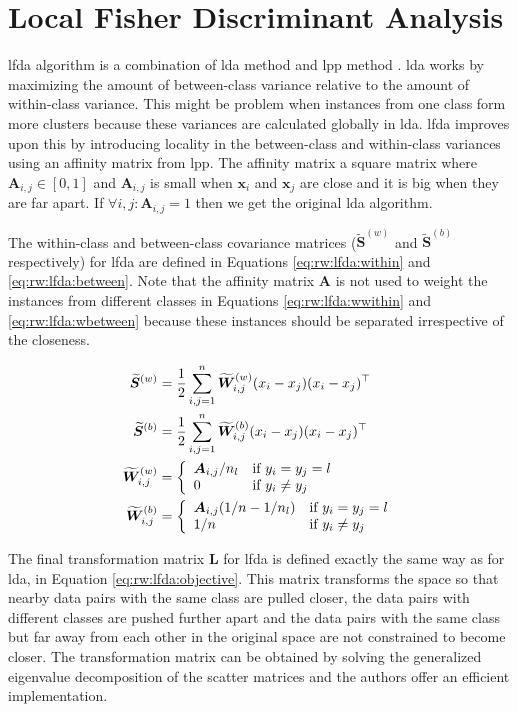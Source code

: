\documentclass[12pt,a4paper]{report}
\begin{document}
\section{Local Fisher Discriminant Analysis} \label{chap:rw:lfda}
\acf{lfda} algorithm \citep{sugiyama2007dimensionality} is a combination of \acf{lda} method \cite{fisher1936use} and \acf{lpp} method \cite{he2003locality}. \ac{lda} works by maximizing the amount of between-class variance relative to the amount of within-class variance. This might be problem when instances from one class form more clusters because these variances are calculated globally in \ac{lda}. \ac{lfda} improves upon this by introducing locality in the between-class and within-class variances using an affinity matrix from \ac{lpp}. The affinity matrix a square matrix where $\bm{A}_{i,j} \in [0,1]$ and $\bm{A}_{i,j}$ is small when $\bm{x}_i$ and $\bm{x}_j$ are close and it is big when they are far apart. If $\forall i,j: \bm{A}_{i,j}=1$ then we get the original \ac{lda} algorithm.

The within-class and between-class covariance matrices ($\widetilde{\bm{S}}^{(w)}$ and $\widetilde{\bm{S}}^{(b)}$ respectively) for \ac{lfda} are defined in Equations \ref{eq:rw:lfda:within} and \ref{eq:rw:lfda:between}. Note that the affinity matrix $\bm{A}$ is not used to weight the instances from different classes in Equations \ref{eq:rw:lfda:wwithin} and \ref{eq:rw:lfda:wbetween} because these instances should be separated irrespective of the closeness.

\begin{align}
\widetilde{\bm{S}}^{(w)} &= \frac{1}{2} \sum_{i,j=1}^n \widetilde{\bm{W}}_{i,j}^{(w)} (x_i-x_j)(x_i-x_j)^\top \label{eq:rw:lfda:within}
\\
\widetilde{\bm{S}}^{(b)} &= \frac{1}{2} \sum_{i,j=1}^n \widetilde{\bm{W}}_{i,j}^{(b)} (x_i-x_j)(x_i-x_j)^\top \label{eq:rw:lfda:between}
\\
\widetilde{\bm{W}}_{i,j}^{(w)} &= \left\{ \begin{array}{ll} \bm{A}_{i,j}/n_l & \mbox{if } y_i=y_j=l \\ 0 & \mbox{if } y_i \neq y_j \end{array} \right. \label{eq:rw:lfda:wwithin}
\\
\widetilde{\bm{W}}_{i,j}^{(b)} &= \left\{ \begin{array}{ll} \bm{A}_{i,j}(1/n-1/n_l) & \mbox{if } y_i=y_j=l \\ 1/n & \mbox{if } y_i \neq y_j \end{array} \right. \label{eq:rw:lfda:wbetween}
\end{align}

The final transformation matrix $\bm{L}$ for \ac{lfda} is defined exactly the same way as for \ac{lda}, in Equation \ref{eq:rw:lfda:objective}. This matrix transforms the space so that nearby data pairs with the same class are pulled closer, the data pairs with different classes are pushed further apart and the data pairs with the same class but far away from each other in the original space are not constrained to become closer. The transformation matrix can be obtained by solving the generalized eigenvalue decomposition of the scatter matrices and the authors offer an efficient implementation.
\end{document}
